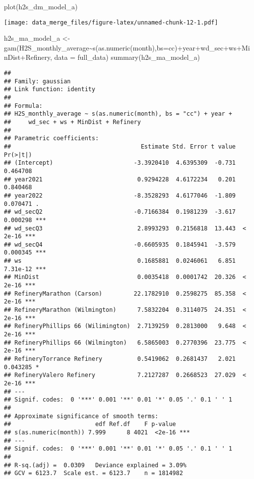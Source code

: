 \documentclass[
]{article}
\newenvironment{Shaded}{\begin{snugshade}}{\end{snugshade}}
\newcommand{\AttributeTok}[1]{\textcolor[rgb]{0.77,0.63,0.00}{#1}}
\newcommand{\FunctionTok}[1]{\textcolor[rgb]{0.00,0.00,0.00}{#1}}
\newcommand{\NormalTok}[1]{#1}
\newcommand{\OtherTok}[1]{\textcolor[rgb]{0.56,0.35,0.01}{#1}}
\newcommand{\SpecialCharTok}[1]{\textcolor[rgb]{0.00,0.00,0.00}{#1}}
\newcommand{\StringTok}[1]{\textcolor[rgb]{0.31,0.60,0.02}{#1}}
\begin{document}
\begin{Shaded}
\begin{Highlighting}[]
\FunctionTok{plot}\NormalTok{(h2s\_dm\_model\_a)}
\end{Highlighting}
\end{Shaded}

\texttt{[image: data\_merge\_files/figure-latex/unnamed-chunk-12-1.pdf]}

\begin{Shaded}
\begin{Highlighting}[]
\NormalTok{h2s\_ma\_model\_a }\OtherTok{\textless{}{-}} \FunctionTok{gam}\NormalTok{(H2S\_monthly\_average}\SpecialCharTok{\textasciitilde{}}\FunctionTok{s}\NormalTok{(}\FunctionTok{as.numeric}\NormalTok{(month),}\AttributeTok{bs=}\StringTok{\textquotesingle{}cc\textquotesingle{}}\NormalTok{)}\SpecialCharTok{+}\NormalTok{year}\SpecialCharTok{+}\NormalTok{wd\_sec}\SpecialCharTok{+}\NormalTok{ws}\SpecialCharTok{+}\NormalTok{MinDist}\SpecialCharTok{+}\NormalTok{Refinery, }\AttributeTok{data =}\NormalTok{ full\_data)}
\FunctionTok{summary}\NormalTok{(h2s\_ma\_model\_a)}
\end{Highlighting}
\end{Shaded}

\begin{verbatim}
## 
## Family: gaussian 
## Link function: identity 
## 
## Formula:
## H2S_monthly_average ~ s(as.numeric(month), bs = "cc") + year + 
##     wd_sec + ws + MinDist + Refinery
## 
## Parametric coefficients:
##                                     Estimate Std. Error t value Pr(>|t|)    
## (Intercept)                       -3.3920410  4.6395309  -0.731 0.464708    
## year2021                           0.9294228  4.6172234   0.201 0.840468    
## year2022                          -8.3528293  4.6177046  -1.809 0.070471 .  
## wd_secQ2                          -0.7166384  0.1981239  -3.617 0.000298 ***
## wd_secQ3                           2.8993293  0.2156818  13.443  < 2e-16 ***
## wd_secQ4                          -0.6605935  0.1845941  -3.579 0.000345 ***
## ws                                 0.1685881  0.0246061   6.851 7.31e-12 ***
## MinDist                            0.0035418  0.0001742  20.326  < 2e-16 ***
## RefineryMarathon (Carson)         22.1782910  0.2598275  85.358  < 2e-16 ***
## RefineryMarathon (Wilmington)      7.5832204  0.3114075  24.351  < 2e-16 ***
## RefineryPhillips 66 (Wilimington)  2.7139259  0.2813000   9.648  < 2e-16 ***
## RefineryPhillips 66 (Wilmington)   6.5865003  0.2770396  23.775  < 2e-16 ***
## RefineryTorrance Refinery          0.5419062  0.2681437   2.021 0.043285 *  
## RefineryValero Refinery            7.2127287  0.2668523  27.029  < 2e-16 ***
## ---
## Signif. codes:  0 '***' 0.001 '**' 0.01 '*' 0.05 '.' 0.1 ' ' 1
## 
## Approximate significance of smooth terms:
##                        edf Ref.df    F p-value    
## s(as.numeric(month)) 7.999      8 4021  <2e-16 ***
## ---
## Signif. codes:  0 '***' 0.001 '**' 0.01 '*' 0.05 '.' 0.1 ' ' 1
## 
## R-sq.(adj) =  0.0309   Deviance explained = 3.09%
## GCV = 6123.7  Scale est. = 6123.7    n = 1814982
\end{verbatim}
\end{document}
